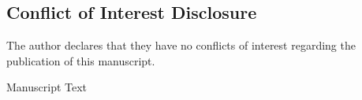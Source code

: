 \documentclass[12pt,english]{article}
\begin{document}
\subsection*{Conflict of Interest Disclosure}
The author declares that they have no conflicts of interest regarding the publication of this manuscript.

\clearpage 


\setcounter{page}{1}
\renewcommand*{\thefootnote}{\arabic{footnote}}
\doublespacing
\begingroup
  \centering
  \Large Manuscript Text\\[1em]
\endgroup


\newpage
\begingroup
{}
\setlength\bibitemsep{5.0pt}
\printbibliography[title=References for Manuscript]
\endgroup
\pagebreak



\appendix
\begin{refsection}

\setcounter{page}{1}
\end{refsection}
\end{document}
